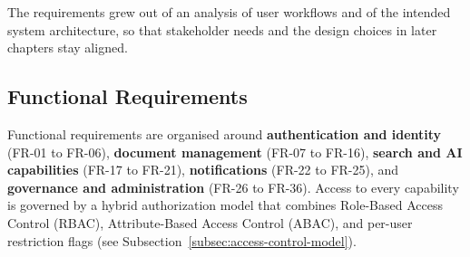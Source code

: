 The requirements grew out of an analysis of user workflows and of the intended
system architecture, so that stakeholder needs and the design choices in later
chapters stay aligned.

\subsection{Functional Requirements}

Functional requirements are organised around
\textbf{authentication and identity} (FR-01 to FR-06),
\textbf{document management} (FR-07 to FR-16),
\textbf{search and AI capabilities} (FR-17 to FR-21),
\textbf{notifications} (FR-22 to FR-25), and
\textbf{governance and administration} (FR-26 to FR-36).
Access to every capability is governed by a hybrid authorization model that
combines Role-Based Access Control (RBAC), Attribute-Based Access Control
(ABAC), and per-user restriction flags
(see Subsection~\ref{subsec:access-control-model}).

